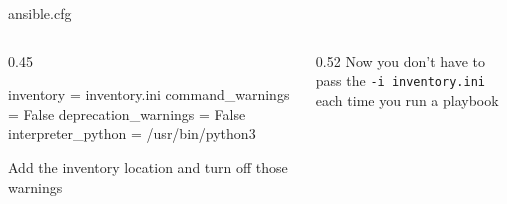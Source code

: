 \documentclass[aspectratio=169,12pt]{beamer}
\begin{document}
\begin{frame}[fragile]{ansible.cfg}
\begin{columns}[T]
\begin{column}{0.45\textwidth}
\begin{codeini}
[defaults]
inventory = inventory.ini
command_warnings = False
deprecation_warnings = False
interpreter_python =
    /usr/bin/python3
\end{codeini}
\vspace{0.3cm}
Add the inventory location and turn off those warnings
\end{column}
\begin{column}{0.52\textwidth}
Now you don't have to pass the \texttt{-i inventory.ini} each time you run a playbook
\vspace{0.3cm}
\end{column}
\end{columns}
\end{frame}
\end{document}
